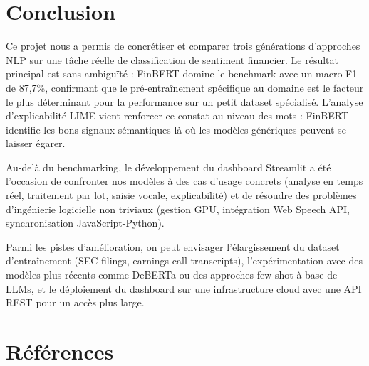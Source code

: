 \documentclass[12pt, a4paper]{article}
\begin{document}
\section{Conclusion}

Ce projet nous a permis de concrétiser et comparer trois générations d'approches
NLP sur une tâche réelle de classification de sentiment financier. Le résultat
principal est sans ambiguïté : FinBERT domine le benchmark avec un macro-F1 de
87,7\%, confirmant que le pré-entraînement spécifique au domaine est le facteur
le plus déterminant pour la performance sur un petit dataset spécialisé. L'analyse
d'explicabilité LIME vient renforcer ce constat au niveau des mots : FinBERT
identifie les bons signaux sémantiques là où les modèles génériques peuvent se
laisser égarer.

Au-delà du benchmarking, le développement du dashboard Streamlit a été l'occasion
de confronter nos modèles à des cas d'usage concrets (analyse en temps réel,
traitement par lot, saisie vocale, explicabilité) et de résoudre des problèmes
d'ingénierie logicielle non triviaux (gestion GPU, intégration Web Speech API,
synchronisation JavaScript-Python).

Parmi les pistes d'amélioration, on peut envisager l'élargissement du dataset
d'entraînement (SEC filings, earnings call transcripts), l'expérimentation avec
des modèles plus récents comme DeBERTa ou des approches few-shot à base de LLMs,
et le déploiement du dashboard sur une infrastructure cloud avec une API REST
pour un accès plus large.

\newpage
\section*{Références}
\end{document}
